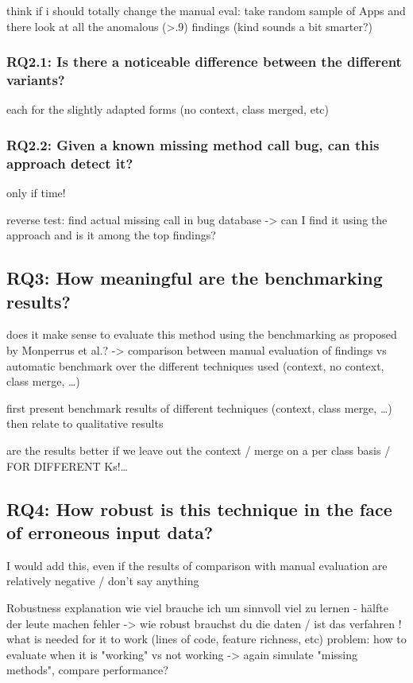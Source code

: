 think if i should totally change the manual eval: take random sample of Apps and there look at all the anomalous (>.9) findings (kind sounds a bit smarter?)

\subsubsection{RQ2.1: Is there a noticeable difference between the different variants?}
each for the slightly adapted forms (no context, class merged, etc)

\subsubsection{RQ2.2: Given a known missing method call bug, can this approach detect it?}
only if time!

reverse test: find actual missing call in bug database -> can I find it using the approach and is it among the top findings?

\subsection{RQ3: How meaningful are the benchmarking results?}
does it make sense to evaluate this method using the benchmarking as proposed by Monperrus et al.?
-> comparison between manual evaluation of findings vs automatic benchmark over the different techniques used (context, no context, class merge, \ldots)

first present benchmark results of different techniques (context, class merge, \ldots) then relate to qualitative results

are the results better if we leave out the context / merge on a per class basis / FOR DIFFERENT Ks!\ldots

\subsection{RQ4: How robust is this technique in the face of erroneous input data?}
I would add this, even if the results of comparison with manual evaluation are relatively negative / don't say anything

Robustness explanation
    wie viel brauche ich um sinnvoll viel zu lernen - hälfte der leute machen fehler -> wie robust brauchst du die daten / ist das verfahren !
    what is needed for it to work (lines of code, feature richness, etc) 
    problem: how to evaluate when it is "working" vs not working -> again simulate "missing methods", compare performance?

